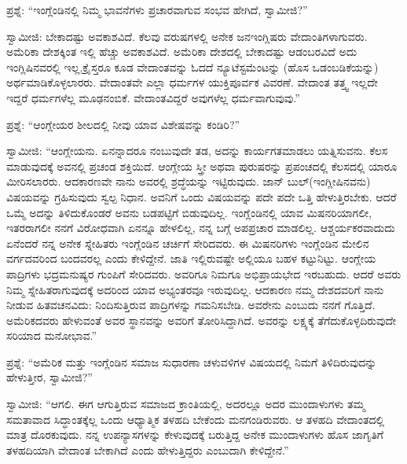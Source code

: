 \vskip 3pt

ಪ್ರಶ್ನೆ: “ಇಂಗ್ಲೆಂಡಿನಲ್ಲಿ ನಿಮ್ಮ ಭಾವನೆಗಳು ಪ್ರಚಾರವಾಗುವ ಸಂಭವ ಹೇಗಿದೆ, ಸ್ವಾಮೀಜಿ?”

\vskip 3pt

ಸ್ವಾಮೀಜಿ: ಬೇಕಾದಷ್ಟು ಅವಕಾಶವಿದೆ. ಕೆಲವು ವರುಷಗಳಲ್ಲಿ ಅನೇಕ ಜನ\break ಇಂಗ್ಲಿಷರು ವೇದಾಂತಿಗಳಾಗುವರು. ಅಮೆರಿಕಾ ದೇಶಕ್ಕಿಂತ ಇಲ್ಲಿ ಹೆಚ್ಚು ಅವಕಾಶವಿದೆ. ಅಮೆರಿಕಾ ದೇಶದಲ್ಲಿ ಬೇಕಾದಷ್ಟು ಆಡಂಬರವಿದೆ ಅದು ಇಂಗ್ಲಿಷಿನವರಲ್ಲಿ ಇಲ್ಲ.\break ಕ್ರೈಸ್ತರೂ ಕೂಡ ವೇದಾಂತವನ್ನು ಓದದೆ ನ್ಯೂಟೆಸ್ಟಮೆಂಟನ್ನು (ಹೊಸ ಒಡಂಬಡಿಕೆಯನ್ನು) ಅರ್ಥಮಾಡಿಕೊಳ್ಳಲಾರರು. ವೇದಾಂತವೇ ಎಲ್ಲಾ ಧರ್ಮಗಳ ಯುಕ್ತಿಪೂರ್ವಕ ವಿವರಣೆ. ವೇದಾಂತ ತತ್ತ್ವ ಇಲ್ಲದೇ ಇದ್ದರೆ ಧರ್ಮಗಳೆಲ್ಲ ಮೂಢನಂಬಿಕೆ. ವೇದಾಂತವಿದ್ದರೆ ಅವುಗಳೆಲ್ಲ ಧರ್ಮವಾಗುವುವು.”

\vskip 3pt

ಪ್ರಶ್ನೆ: “ಆಂಗ್ಲೇಯರ ಶೀಲದಲ್ಲಿ ನೀವು ಯಾವ ವಿಶೇಷವನ್ನು ಕಂಡಿರಿ?”

\vskip 3pt

ಸ್ವಾಮೀಜಿ: “ಆಂಗ್ಲೇಯನು. ಏನನ್ನಾದರೂ ನಂಬುವುದೇ ತಡ, ಅದನ್ನು ಕಾರ್ಯಗತಮಾಡಲು ಯತ್ನಿಸುವನು. ಕೆಲಸ ಮಾಡುವುದಕ್ಕೆ ಅವನಲ್ಲಿ ಪ್ರಚಂಡ ಶಕ್ತಿಯಿದೆ. ಆಂಗ್ಲೇಯ ಸ್ತ್ರೀ ಅಥವಾ ಪುರುಷರನ್ನು ಪ್ರಪಂಚದಲ್ಲಿ ಕೆಲಸದಲ್ಲಿ ಯಾರೂ ಮೀರಿಸಲಾರರು. ಆದಕಾರಣವೇ ನಾನು ಅವರಲ್ಲಿ ಶ್ರದ್ಧೆಯನ್ನು ಇಟ್ಟಿರುವುದು. ಜಾನ್​ ಬುಲ್​ (ಇಂಗ್ಲೀಷಿನವನು) ವಿಷಯವನ್ನು ಗ್ರಹಿಸುವುದು ಸ್ವಲ್ಪ ನಿಧಾನ. ಅವನಿಗೆ ಒಂದು ವಿಷಯವನ್ನು ಪದೇ ಪದೇ ಒತ್ತಿ ಹೇಳುತ್ತಿರಬೇಕು. ಆದರೆ ಒಮ್ಮೆ ಅದನ್ನು ತಿಳಿದುಕೊಂಡರೆ ಅವನು ಬಡಪಟ್ಟಿಗೆ ಬಿಡುವುದಿಲ್ಲ. ಇಂಗ್ಲೆಂಡಿನಲ್ಲಿ ಯಾವ ಮಿಷನರಿಯಾಗಲೀ, ಇತರರಾಗಲೀ ನನಗೆ ವಿರೋಧವಾಗಿ ಏನನ್ನೂ ಹೇಳಲಿಲ್ಲ, ನನ್ನ ಬಗ್ಗೆ ಅಪಪ್ರಚಾರ ಮಾಡಲಿಲ್ಲ. ಆಶ್ಚರ್ಯಕರವಾದುದು ಏನೆಂದರೆ ನನ್ನ ಅನೇಕ ಸ್ನೇಹಿತರು ಇಂಗ್ಲೆಂಡಿನ ಚರ್ಚಿಗೆ ಸೇರಿದವರು. ಈ ಮಿಷನರಿಗಳು ಇಂಗ್ಲೆಂಡಿನ ಮೇಲಿನ ವರ್ಗದವರಿಂದ ಬಂದವರಲ್ಲ ಎಂದು ಕೇಳಿದ್ದೇನೆ. ಜಾತಿ ಇಲ್ಲಿರುವಷ್ಟೇ ಅಲ್ಲಿಯೂ ಬಹಳ ಕಟ್ಟುನಿಟ್ಟು. ಆಂಗ್ಲೇಯ ಪಾದ್ರಿಗಳು ಭದ್ರಮನುಷ್ಯರ ಗುಂಪಿಗೆ ಸೇರಿದವರು. ಅವರಿಗೂ ನಿಮಗೂ ಅಭಿಪ್ರಾಯಭೇದ ಇರಬಹುದು. ಆದರೆ ಅವರು ನಿಮ್ಮ ಸ್ನೇಹಿತರಾಗುವುದಕ್ಕೆ ಅದರಿಂದ ಯಾವ ಅಭ್ಯಂತರವೂ ಇರುವುದಿಲ್ಲ. ಆದಕಾರಣ ನಮ್ಮ ದೇಶದವರಿಗೆ ನಾನು ನೀಡುವ ಹಿತವಚನವಿದು: ನಿಂದಿಸುತ್ತಿರುವ ಪಾದ್ರಿಗಳನ್ನು ಗಮನಿಸಬೇಡಿ. ಅವರೇನು ಎಂಬುದು ನನಗೆ ಗೊತ್ತಿದೆ. ಅಮೆರಿಕದವರು ಹೇಳುವಂತೆ ಅವರ ಸ್ಥಾನವನ್ನು ಅವರಿಗೆ ತೋರಿಸಿದ್ದಾಗಿದೆ. ಅವರನ್ನು ಲಕ್ಷ್ಯಕ್ಕೆ ತೆಗೆದುಕೊಳ್ಳದಿರುವುದೇ ಸರಿಯಾದ ಮನೋಭಾವ.”

\vskip 3pt

ಪ್ರಶ್ನೆ: “ಅಮೆರಿಕ ಮತ್ತು ಇಂಗ್ಲೆಂಡಿನ ಸಮಾಜ ಸುಧಾರಣಾ ಚಳುವಳಿಗಳ ವಿಷಯದಲ್ಲಿ ನಿಮಗೆ ತಿಳಿದಿರುವುದನ್ನು ಹೇಳುತ್ತೀರ, ಸ್ವಾಮೀಜಿ?”

\vskip 4pt

ಸ್ವಾಮೀಜಿ: “ಆಗಲಿ. ಈಗ ಆಗುತ್ತಿರುವ ಸಮಾಜದ ಕ್ರಾಂತಿಯಲ್ಲಿ, ಅದರಲ್ಲೂ ಅದರ ಮುಂದಾಳುಗಳು ತಮ್ಮ ಸಮತಾವಾದ ಸಿದ್ಧಾಂತಕ್ಕೆಲ್ಲ ಒಂದು ಆಧ್ಯಾತ್ಮಿಕ ತಳಹದಿ ಬೇಕೆಂದು ಮನಗಂಡಿರುವರು. ಆ ತಳಹದಿ ವೇದಾಂತದಲ್ಲಿ ಮಾತ್ರ ದೊರಕುವುದು. ನನ್ನ ಉಪನ್ಯಾಸಗಳನ್ನು ಕೇಳುವುದಕ್ಕೆ ಬರುತ್ತಿದ್ದ ಅನೇಕ ಮುಂದಾಳುಗಳು ಹೊಸ ಜಾಗೃತಿಗೆ ತಳಹದಿಯಾಗಿ ವೇದಾಂತ ಬೇಕಾಗಿದೆ ಎಂದು ಹೇಳುತ್ತಿದ್ದರು ಎಂಬುದಾಗಿ ಕೇಳಿದ್ದೇನೆ.”

